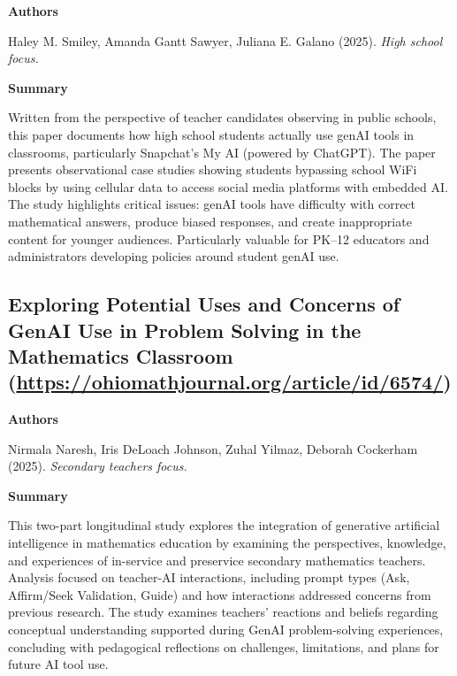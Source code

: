 \documentclass[11pt, a4paper]{article}
\newenvironment{annotation}[1]
{\par\vspace{2pt}\noindent\textbf{#1}\par\vspace{1pt}\noindent\small\ignorespaces}
{\par\vspace{3pt}}
\begin{document}
\begin{annotation}{Authors}
Haley M. Smiley, Amanda Gantt Sawyer, Juliana E. Galano (2025). \textit{High school focus.}
\end{annotation}


\begin{annotation}{Summary}
Written from the perspective of teacher candidates observing in public schools, this paper documents how high school students actually use genAI tools in classrooms, particularly Snapchat's My AI (powered by ChatGPT). The paper presents observational case studies showing students bypassing school WiFi blocks by using cellular data to access social media platforms with embedded AI. The study highlights critical issues: genAI tools have difficulty with correct mathematical answers, produce biased responses, and create inappropriate content for younger audiences. Particularly valuable for PK--12 educators and administrators developing policies around student genAI use.
\end{annotation}


\subsection[\texorpdfstring{Exploring Potential Uses and Concerns of GenAI Use in Problem Solving in the Mathematics Classroom }{Exploring Potential Uses and Concerns of GenAI Use in Problem Solving in the Mathematics Classroom }]{Exploring Potential Uses and Concerns of GenAI Use in Problem Solving in the Mathematics Classroom (\texorpdfstring{\url{https://ohiomathjournal.org/article/id/6574/}}{})}

\begin{annotation}{Authors}
Nirmala Naresh, Iris DeLoach Johnson, Zuhal Yilmaz, Deborah Cockerham (2025). \textit{Secondary teachers focus.}
\end{annotation}

\begin{annotation}{Summary}
This two-part longitudinal study explores the integration of generative artificial intelligence in mathematics education by examining the perspectives, knowledge, and experiences of in-service and preservice secondary mathematics teachers. Analysis focused on teacher-AI interactions, including prompt types (Ask, Affirm/Seek Validation, Guide) and how interactions addressed concerns from previous research. The study examines teachers' reactions and beliefs regarding conceptual understanding supported during GenAI problem-solving experiences, concluding with pedagogical reflections on challenges, limitations, and plans for future AI tool use.
\end{annotation}
\end{document}
